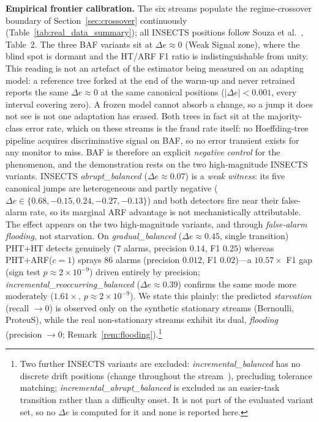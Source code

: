 \documentclass[10pt,conference]{IEEEtran}
\theoremstyle{definition}
\begin{document}
\textbf{Empirical frontier calibration.}
The six streams populate the regime-crossover boundary of Section~\ref{sec:crossover} continuously (Table~\ref{tab:real_data_summary}); all INSECTS positions follow Souza et al.~\cite{souza_insects_2020}, Table~2. The three BAF variants sit at $\Delta e \approx 0$ (Weak Signal zone), where the blind spot is dormant and the HT/ARF F1 ratio is indistinguishable from unity. This reading is not an artefact of the estimator being measured on an adapting model: a reference tree forked at the end of the warm-up and never retrained reports the same $\Delta e \approx 0$ at the same canonical positions ($|\Delta e| < 0.001$, every interval covering zero). A frozen model cannot absorb a change, so a jump it does not see is not one adaptation has erased. Both trees in fact sit at the majority-class error rate, which on these streams is the fraud rate itself: no Hoeffding-tree pipeline acquires discriminative signal on BAF, so no error transient exists for any monitor to miss. BAF is therefore an explicit \emph{negative control} for the phenomenon, and the demonstration rests on the two high-magnitude INSECTS variants. INSECTS \emph{abrupt\_balanced} ($\Delta e \approx 0.07$) is a \emph{weak witness}: its five canonical jumps are heterogeneous and partly negative ($\Delta e \in \{0.68, -0.15, 0.24, -0.27, -0.13\}$) and both detectors fire near their false-alarm rate, so its marginal ARF advantage is not mechanistically attributable. The effect appears on the two high-magnitude variants, and through \emph{false-alarm flooding}, not starvation. On \emph{gradual\_balanced} ($\Delta e \approx 0.45$, single transition) PHT+HT detects genuinely ($7$ alarms, precision $0.14$, F1 $0.25$) whereas PHT+ARF($c{=}1$) sprays $86$ alarms (precision $0.012$, F1 $0.02$)---a $10.57\times$ F1 gap (sign test $p \approx 2 \times 10^{-9}$) driven entirely by precision; \emph{incremental\_reoccurring\_balanced} ($\Delta e \approx 0.39$) confirms the same mode more moderately ($1.61\times$, $p \approx 2 \times 10^{-9}$). We state this plainly: the predicted \emph{starvation} (recall $\to 0$) is observed only on the synthetic stationary streams (Bernoulli, ProteuS), while the real non-stationary streams exhibit its dual, \emph{flooding} (precision $\to 0$; Remark~\ref{rem:flooding}).\footnote{Two further INSECTS variants are excluded: \emph{incremental\_balanced} has no discrete drift positions (change throughout the stream~\cite{souza_insects_2020}), precluding tolerance matching; \emph{incremental\_abrupt\_balanced} is excluded as an easier-task transition rather than a difficulty onset. It is not part of the evaluated variant set, so no $\Delta e$ is computed for it and none is reported here.}
\end{document}
